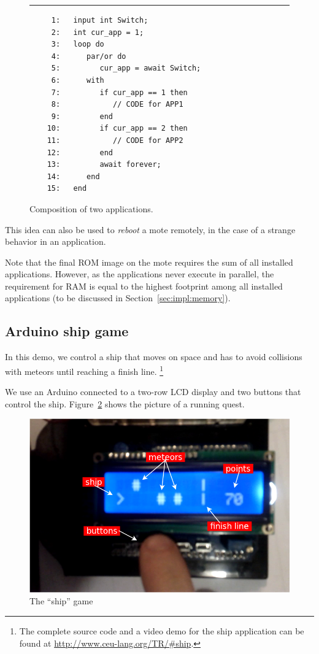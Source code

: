 \documentclass[11pt,a4paper]{article}
\newcommand{\2}{\;\;}
\newcommand{\5}{\;\;\;\;\;}
\begin{document}
\begin{figure}[h]
\rule{15cm}{0.37pt}
{\small
\begin{verbatim}
     1:   input int Switch;
     2:   int cur_app = 1;
     3:   loop do
     4:      par/or do
     5:         cur_app = await Switch;
     6:      with
     7:         if cur_app == 1 then
     8:            // CODE for APP1
     9:         end
    10:         if cur_app == 2 then
    11:            // CODE for APP2
    12:         end
    13:         await forever;
    14:      end
    15:   end
\end{verbatim}
}
\caption{ Composition of two applications.
\label{lst:demos:ring:4}
}
\end{figure}

This idea can also be used to \emph{reboot} a mote remotely, in the case of a 
strange behavior in an application.

Note that the final ROM image on the mote requires the sum of all installed 
applications.
However, as the applications never execute in parallel, the requirement for RAM 
is equal to the highest footprint among all installed applications (to be 
discussed in Section~\ref{sec:impl:memory}).

\subsection{Arduino ship game}

In this demo, we control a ship that moves on space and has to avoid collisions 
with meteors until reaching a finish line.%
\footnote{The complete source code and a video demo for the ship application 
can be found at \url{http://www.ceu-lang.org/TR/\#ship}.}

We use an Arduino connected to a two-row LCD display and two buttons that 
control the ship.
Figure~\ref{fig:ship} shows the picture of a running quest.

\begin{figure}[t]
\centering
\includegraphics[scale=0.33]{ship.png}
\caption{ The ``ship'' game
\label{fig:ship}
}
\end{figure}
\end{document}
